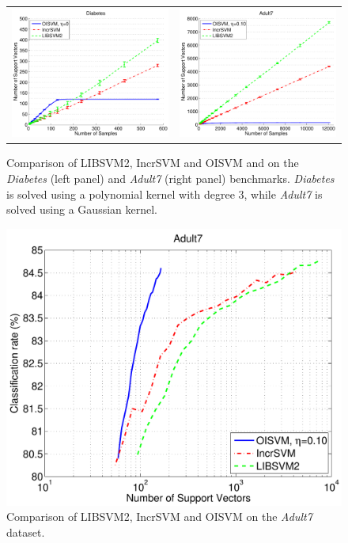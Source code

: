 \begin{figure}[t]
  \centering \footnotesize
  \begin{tabular}{cc}
  \includegraphics[width=0.48\linewidth]{figs/results/diabetis_sv} &
  \includegraphics[width=0.48\linewidth]{figs/results/adult7_sv} 
  \end{tabular}
  \caption{Comparison of LIBSVM2, IncrSVM and OISVM and on the \emph{Diabetes}
  (left panel) and \emph{Adult7} (right panel) benchmarks.
  \emph{Diabetes} is solved using a polynomial kernel with degree $3$,
  while \emph{Adult7} is solved using a Gaussian kernel.}
\label{fig:ad7}
\end{figure}

\begin{figure}[t]
  \centering \footnotesize
  \includegraphics[width=0.48\linewidth]{figs/results/adult7_sv_cr}
  \caption{Comparison of LIBSVM2, IncrSVM and OISVM on the \emph{Adult7} dataset.}
\label{fig:sv_cr}
\end{figure}

